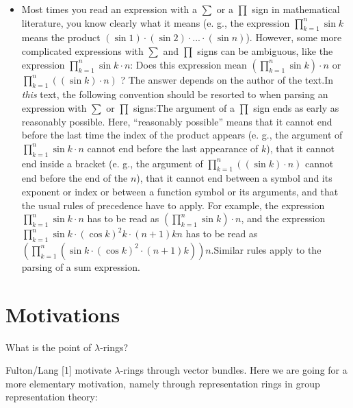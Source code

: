 \documentclass[numbers=enddot,12pt,final,onecolumn,notitlepage]{scrartcl}%
\begin{document}
\begin{itemize}
\item Most times you read an expression with a $\sum$ or a $\prod$ sign in
mathematical literature, you know clearly what it means (e. g., the expression
$\prod\limits_{k=1}^{n}\sin k$ means the product $\left(  \sin1\right)
\cdot\left(  \sin2\right)  \cdot...\cdot\left(  \sin n\right)  $). However,
some more complicated expressions with $\sum$ and $\prod$ signs can be
ambiguous, like the expression $\prod\limits_{k=1}^{n}\sin k\cdot n$: Does
this expression mean $\left(  \prod\limits_{k=1}^{n}\sin k\right)  \cdot n$ or
$\prod\limits_{k=1}^{n}\left(  \left(  \sin k\right)  \cdot n\right)  $ ? The
answer depends on the author of the text.\newline In \textit{this} text, the
following convention should be resorted to when parsing an expression with
$\sum$ or $\prod$ signs:\newline The argument of a $\prod$ sign ends as early
as reasonably possible. Here, ``reasonably possible'' means that it cannot end
before the last time the index of the product appears (e. g., the argument of
$\prod\limits_{k=1}^{n}\sin k\cdot n$ cannot end before the last appearance of
$k$), that it cannot end inside a bracket (e. g., the argument of
$\prod\limits_{k=1}^{n}\left(  \left(  \sin k\right)  \cdot n\right)  $ cannot
end before the end of the $n$), that it cannot end between a symbol and its
exponent or index or between a function symbol or its arguments, and that the
usual rules of precedence have to apply. For example, the expression
$\prod\limits_{k=1}^{n}\sin k\cdot n$ has to be read as $\left(
\prod\limits_{k=1}^{n}\sin k\right)  \cdot n$, and the expression
$\prod\limits_{k=1}^{n}\sin k\cdot\left(  \cos k\right)  ^{2}k\cdot\left(
n+1\right)  kn$ has to be read as $\left(  \prod\limits_{k=1}^{n}\left(  \sin
k\cdot\left(  \cos k\right)  ^{2}\cdot\left(  n+1\right)  k\right)  \right)
n$.\newline Similar rules apply to the parsing of a sum expression.
\end{itemize}

\section{Motivations}

What is the point of $\lambda$-rings?

Fulton/Lang [1] motivate $\lambda$-rings through vector bundles. Here we are
going for a more elementary motivation, namely through representation rings in
group representation theory:
\end{document}

